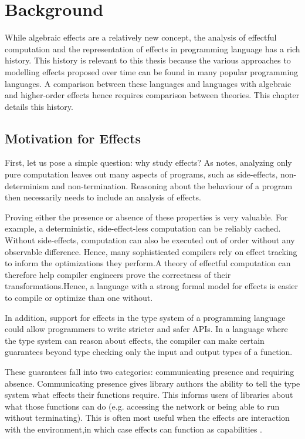 \chapter{Background}\label{chap:background}

While algebraic effects are a relatively new concept, the analysis of effectful computation and the representation of effects in programming language has a rich history. This history is relevant to this thesis because the various approaches to modelling effects proposed over time can be found in many popular programming languages. A comparison between these languages and languages with algebraic and higher-order effects hence requires comparison between theories. This chapter details this history.


\section{Motivation for Effects}

First, let us pose a simple question: why study effects? As \textcite{moggi_computational_1989} notes, analyzing only pure computation leaves out many aspects of programs, such as side-effects, non-determinism and non-termination. Reasoning about the behaviour of a program then necessarily needs to include an analysis of effects.

Proving either the presence or absence of these properties is very valuable. For example, a deterministic, side-effect-less computation can be reliably cached. Without side-effects, computation can also be executed out of order without any observable difference. Hence, many sophisticated compilers rely on effect tracking to inform the optimizations they perform.\citationneeded A theory of effectful computation can therefore help compiler engineers prove the correctness of their transformations.\citationneeded Hence, a language with a strong formal model for effects is easier to compile or optimize than one without.

In addition, support for effects in the type system of a programming language could allow programmers to write stricter and safer APIs. In a language where the type system can reason about effects, the compiler can make certain guarantees beyond type checking only the input and output types of a function.

These guarantees fall into two categories: communicating presence and requiring absence. Communicating presence gives library authors the ability to tell the type system what effects their functions require. This informs users of libraries about what those functions can do (e.g. accessing the network or being able to run without terminating). This is often most useful when the effects are interaction with the environment,in which case effects can function as capabilities \autocite{brachthauser_effects_2020}.

